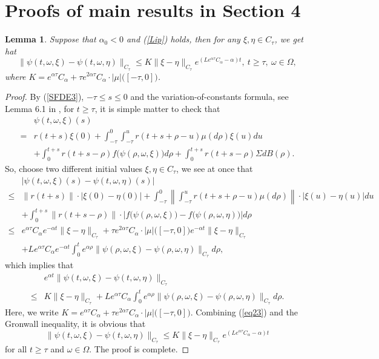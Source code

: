 \documentclass[preprint,12pt]{elsarticle}
\newtheorem{lemma}{Lemma}[section]
\begin{document}
\section{Proofs of main results in Section 4}
\noindent
\begin{lemma}\label{lem1}
Suppose that $\alpha_0<0$ and (\ref{Lip}) holds, then for any $\xi,\eta\in C_\tau$, we get hat
\begin{equation}\label{Conclu7}
\|\psi(t,\omega,\xi)-\psi(t,\omega,\eta)\|_{C_\tau}\leq K\|\xi-\eta\|_{C_\tau}e^{(Le^{\alpha\tau}C_\alpha-\alpha)t},\ t\geq\tau,\ \omega\in\Omega,
\end{equation}
where $K=e^{\alpha\tau}C_\alpha+\tau e^{2\alpha\tau}C_\alpha\cdot|\mu|\bigl([-\tau,0]\bigr)$.
\end{lemma}
\begin{proof}
By (\ref{SFDE3}), $-\tau\leq s\leq0$ and the variation-of-constants formula, see Lemma 6.1 in \cite{RRG}, for $t\geq\tau$, it is simple matter to check that
\begin{align}\label{eq21}
&\psi(t,\omega,\xi)(s)\nonumber\\
=&r(t+s)\xi(0)+\int_{-\tau}^0\int_{-\tau}^{u}r(t+s+\rho-u)\mu(d\rho)\xi(u)du\nonumber\\
&+\int_0^{t+s}r(t+s-\rho)f\bigl(\psi(\rho,\omega,\xi)\bigr)d\rho+\int_0^{t+s}r(t+s-\rho)\Sigma dB(\rho).
\end{align}
So, choose two different initial values $\xi,\eta\in C_\tau$, we see at once that
\begin{align}\label{eq22}
&|\psi(t,\omega,\xi)(s)-\psi(t,\omega,\eta)(s)|\nonumber\\
\leq&\|r(t+s)\|\cdot|\xi(0)-\eta(0)|+\int_{-\tau}^0\left\|\int_{-\tau}^{u}r(t+s+\rho-u)\mu(d\rho)\right\|\cdot|\xi(u)-\eta(u)|du\nonumber\\
&+\int_0^{t+s}\|r(t+s-\rho)\|\cdot|f\bigl(\psi(\rho,\omega,\xi)\bigr)-f\bigl(\psi(\rho,\omega,\eta)\bigr)|d\rho\nonumber\\
\leq&e^{\alpha\tau}C_\alpha e^{-\alpha t}\|\xi-\eta\|_{C_\tau}+\tau e^{2\alpha\tau}C_\alpha\cdot|\mu|\bigl([-\tau,0]\bigr)e^{-\alpha t}\|\xi-\eta\|_{C_\tau}\nonumber\\
&+Le^{\alpha\tau}C_\alpha e^{-\alpha t}\int_0^{t}e^{\alpha\rho}\|\psi(\rho,\omega,\xi)-\psi(\rho,\omega,\eta)\|_{C_\tau}d\rho,
\end{align}
which implies that
\begin{align}\label{eq23}
&e^{\alpha t}\|\psi(t,\omega,\xi)-\psi(t,\omega,\eta)\|_{C_\tau}\nonumber\\
\leq&K\|\xi-\eta\|_{C_\tau}+Le^{\alpha\tau}C_\alpha\int_0^{t}e^{\alpha\rho}\|\psi(\rho,\omega,\xi)-\psi(\rho,\omega,\eta)\|_{C_\tau}d\rho.
\end{align}
Here, we write $K=e^{\alpha\tau}C_\alpha+\tau e^{2\alpha\tau}C_\alpha\cdot|\mu|\bigl([-\tau,0]\bigr)$. Combining (\ref{eq23}) and the Gronwall inequality, it is obvious that
\begin{equation}\label{eq24}
\|\psi(t,\omega,\xi)-\psi(t,\omega,\eta)\|_{C_\tau}\leq K\|\xi-\eta\|_{C_\tau}e^{(Le^{\alpha\tau}C_\alpha-\alpha)t}
\end{equation}
for all $t\geq\tau$ and $\omega\in\Omega$. The proof is complete.
\end{proof}
\end{document}
